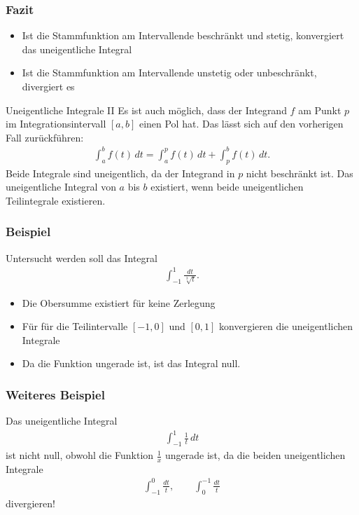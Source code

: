 \begin{frame}
  \frametitle<presentation>{Fazit}
  \begin{itemize}
  \item Ist die Stammfunktion am Intervallende beschränkt und stetig,
    konvergiert das uneigentliche Integral
  \item Ist die Stammfunktion am Intervallende unstetig oder
    unbeschränkt, divergiert es
  \end{itemize}
\end{frame}

\begin{frame}{Uneigentliche Integrale II}
    Es ist auch möglich, dass der Integrand $f$ am Punkt $p$ im Integrationsintervall $[a,b]$ einen Pol hat. Das lässt sich auf den vorherigen Fall zurückführen:
    \begin{gather*}
        \int_a^b f(t)\,dt = \int_a^p f(t)\,dt + \int_p^bf(t)\,dt.
    \end{gather*}
    Beide Integrale sind uneigentlich, da der Integrand in $p$ nicht beschränkt ist.
    Das uneigentliche Integral von $a$ bis $b$ existiert, wenn beide uneigentlichen Teilintegrale existieren.
\end{frame}

\begin{frame}
    \frametitle<presentation>{Beispiel}
    Untersucht werden soll das Integral
    \begin{gather*}
        \int_{-1}^1 \frac{dt}{\sqrt[3]{t}}.
    \end{gather*}
    \begin{itemize}
    \item Die Obersumme existiert für keine Zerlegung
    \item Für für die Teilintervalle $[-1,0]$ und $[0,1]$ konvergieren die uneigentlichen Integrale
    \item Da die Funktion ungerade ist, ist das Integral null.
    \end{itemize}
\end{frame}

\begin{frame}
    \frametitle<presentation>{Weiteres Beispiel}
    Das uneigentliche Integral
    \begin{gather*}
        \int_{-1}^1 \frac{1}{t}\,dt
    \end{gather*}
    \pause
    \noindent ist nicht null, obwohl die Funktion $\tfrac1x$ ungerade ist, da die beiden uneigentlichen Integrale
    \begin{gather*}
        \int_{-1}^0 \frac{dt}{t},\qquad
        \int_0^{-1} \frac{dt}{t}
    \end{gather*}
    divergieren!
\end{frame}

